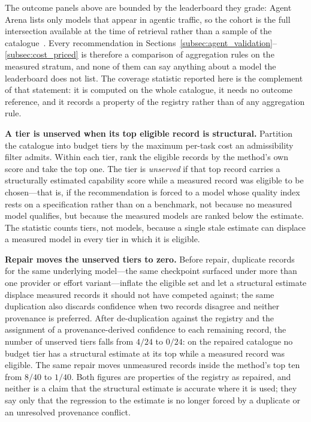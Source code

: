 \documentclass[pdflatex,sn-mathphys-num]{sn-jnl}
\theoremstyle{thmstyleone}
\theoremstyle{thmstylethree}
\begin{document}
The outcome panels above are bounded by the leaderboard they grade: Agent Arena lists only models that appear in agentic traffic, so the cohort is the full intersection available at the time of retrieval rather than a sample of the catalogue~\cite{arenaagent2026}. Every recommendation in Sections~\ref{subsec:agent_validation}--\ref{subsec:cost_priced} is therefore a comparison of aggregation rules on the measured stratum, and none of them can say anything about a model the leaderboard does not list. The coverage statistic reported here is the complement of that statement: it is computed on the whole catalogue, it needs no outcome reference, and it records a property of the registry rather than of any aggregation rule.

\textbf{A tier is unserved when its top eligible record is structural.} Partition the catalogue into budget tiers by the maximum per-task cost an admissibility filter admits. Within each tier, rank the eligible records by the method's own score and take the top one. The tier is \emph{unserved} if that top record carries a structurally estimated capability score while a measured record was eligible to be chosen---that is, if the recommendation is forced to a model whose quality index rests on a specification rather than on a benchmark, not because no measured model qualifies, but because the measured models are ranked below the estimate. The statistic counts tiers, not models, because a single stale estimate can displace a measured model in every tier in which it is eligible.

\textbf{Repair moves the unserved tiers to zero.} Before repair, duplicate records for the same underlying model---the same checkpoint surfaced under more than one provider or effort variant---inflate the eligible set and let a structural estimate displace measured records it should not have competed against; the same duplication also discards confidence when two records disagree and neither provenance is preferred. After de-duplication against the registry and the assignment of a provenance-derived confidence to each remaining record, the number of unserved tiers falls from $4/24$ to $0/24$: on the repaired catalogue no budget tier has a structural estimate at its top while a measured record was eligible. The same repair moves unmeasured records inside the method's top ten from $8/40$ to $1/40$. Both figures are properties of the registry as repaired, and neither is a claim that the structural estimate is accurate where it is used; they say only that the regression to the estimate is no longer forced by a duplicate or an unresolved provenance conflict.
\end{document}
